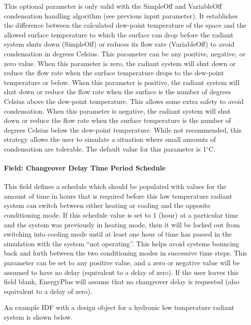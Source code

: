 This optional parameter is only valid with the SimpleOff and VariableOff condensation handling algorithm (see previous input parameter). It establishes the difference between the calculated dew-point temperature of the space and the allowed surface temperature to which the surface can drop before the radiant system shuts down (SimpleOff) or reduces its flow rate (VariableOff) to avoid condensation in degrees Celsius. This parameter can be any positive, negative, or zero value. When this parameter is zero, the radiant system will shut down or reduce the flow rate when the surface temperature drops to the dew-point temperature or below. When this parameter is positive, the radiant system will shut down or reduce the flow rate when the surface is the number of degrees Celsius above the dew-point temperature. This allows some extra safety to avoid condensation. When this parameter is negative, the radiant system will shut down or reduce the flow rate when the surface temperature is the number of degrees Celsius below the dew-point temperature. While not recommended, this strategy allows the user to simulate a situation where small amounts of condensation are tolerable.  The default value for this parameter is 1$^\circ$C.


\paragraph{Field: Changeover Delay Time Period Schedule}\label{field-changeover-delay-time-period-schedule}

This field defines a schedule which should be populated with values for the amount of time in hours that is required before this low temperature radiant system can switch between either heating or cooling and the opposite conditioning mode.  If this schedule value is set to 1 (hour) at a particular time and the system was previously in heating mode, then it will be locked out from switching into cooling mode until at least one hour of time has passed in the simulation with the system ``not operating''.  This helps avoid systems bouncing back and forth between the two conditioning modes in successive time steps.  This parameter can be set to any positive value, and a zero or negative value will be assumed to have no delay (equivalent to a delay of zero).  If the user leaves this field blank, EnergyPlus will assume that no changeover delay is requested (also equivalent to a delay of zero).

An example IDF with a design object for a hydronic low temperature radiant system is shown below.

